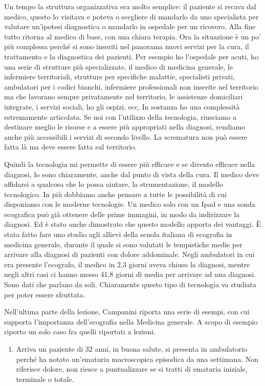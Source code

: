 \documentclass[]{article}
\begin{document}
Un tempo la struttura organizzativa era molto semplice: il paziente si
recava dal medico, questo lo visitava e poteva o scegliere di mandarlo
da uno specialista per valutare un'ipotesi diagnostica o mandarlo in
ospedale per un ricovero. Alla fine tutto ritorna al medico di base, con
una chiara terapia. Ora la situazione è un po' più complessa perché si
sono inseriti nel panorama nuovi servizi per la cura, il trattamento e
la diagnostica dei pazienti. Per esempio ho l'ospedale per acuti, ho una
serie di strutture più specializzate, il medico di medicina generale, le
infermiere territoriali, strutture per specifiche malattie, specialisti
privati, ambulatori per i codici bianchi, infermiere professionali non
inserite nel territorio ma che lavorano sempre privatamente nel
territorio, le assistenze domiciliari integrate, i servizi sociali, ho
gli ospizi, ecc, In sostanza ho una complessità estremamente articolata.
Se noi con l'utilizzo della tecnologia, riusciamo a destinare meglio le
risorse e a essere più appropriati nella diagnosi, rendiamo anche più
accessibili i servizi di secondo livello. La scrematura non può essere
fatta là ma deve essere fatta sul territorio.

Quindi la tecnologia mi permette di essere più efficace e se divento
efficace nella diagnosi, lo sono chiaramente, anche dal punto di vista
della cura. Il medico deve affidarsi a qualcosa che lo possa aiutare, la
strumentazione, il modello tecnologico. In più dobbiamo anche pensare a
tutte le possibilità di cui disponiamo con le moderne tecnologie. Un
medico solo con un Ipad e una sonda ecografica può già ottenere delle
prime immagini, in modo da indirizzare la diagnosi. Ed è stato anche
dimostrato che questo modello apporta dei vantaggi. È stata fatto fare
uno studio agli allievi della scuola italiana di ecografia in medicina
generale, durante il quale si sono valutati le tempistiche medie per
arrivare alla diagnosi di pazienti con dolore addominale. Negli
ambulatori in cui era presente l'ecografo, il medico in 2,3 giorni aveva
chiuso la diagnosi, mentre negli altri casi ci hanno messo 41,8 giorni
di media per arrivare ad una diagnosi. Sono dati che parlano da soli.
Chiaramente questo tipo di tecnologia va studiata per poter essere
sfruttata.

Nell'ultima parte della lezione, Campanini riporta una serie di esempi,
con cui supporta l'importanza dell'ecografia nella Medicina generale. A
scopo di esempio riporto un solo caso fra quelli riportati a lezioni.

\begin{enumerate}
\def\labelenumi{\arabic{enumi}.}
\item
  Arriva un paziente di 32 anni, in buona salute, si presenta in
  ambulatorio perché ha notato un'ematuria macroscopica episodica da una
  settimana. Non riferisce dolore, non riesce a puntualizzare se si
  tratti di ematuria iniziale, terminale o totale.
\end{enumerate}
\end{document}
